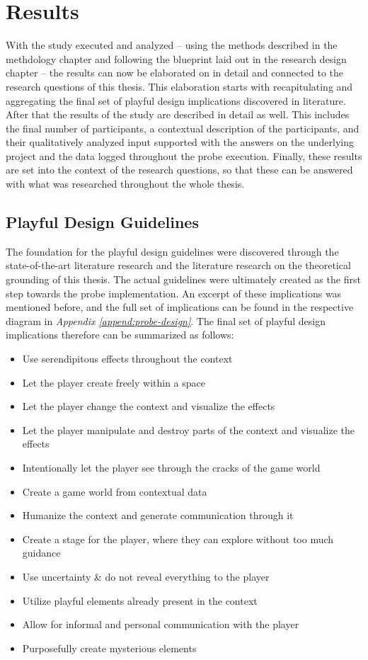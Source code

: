 \section{Results}

With the study executed and analyzed -- using the methods described in the methdology chapter and following the blueprint laid out in the research design chapter -- the results can now be elaborated on in detail and connected to the research questions of this thesis. This elaboration starts with recapitulating and aggregating the final set of playful design implications discovered in literature. After that the results of the study are described in detail as well. This includes the final number of participants, a contextual description of the participants, and their qualitatively analyzed input supported with the answers on the underlying project and the data logged throughout the probe execution. Finally, these results are set into the context of the research questions, so that these can be answered with what was researched throughout the whole thesis.

\subsection{Playful Design Guidelines}

The foundation for the playful design guidelines were discovered through the state-of-the-art literature research and the literature research on the theoretical grounding of this thesis. The actual guidelines were ultimately created as the first step towards the probe implementation. An excerpt of these implications was mentioned before, and the full set of implications can be found in the respective diagram in \textit{Appendix \ref{append:probe-design}}. The final set of playful design implications therefore can be summarized as follows:

\begin{itemize}
  \item{Use serendipitous effects throughout the context}
  \item{Let the player create freely within a space}
  \item{Let the player change the context and visualize the effects}
  \item{Let the player manipulate and destroy parts of the context and visualize the effects}
  \item{Intentionally let the player see through the cracks of the game world}
  \item{Create a game world from contextual data}
  \item{Humanize the context and generate communication through it}
  \item{Create a stage for the player, where they can explore without too much guidance}
  \item{Use uncertainty \& do not reveal everything to the player}
  \item{Utilize playful elements already present in the context}
  \item{Allow for informal and personal communication with the player}
  \item{Purposefully create mysterious elements}
\end{itemize}

